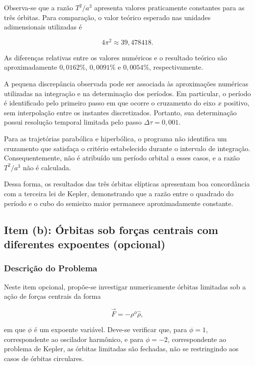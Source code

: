 \documentclass[12pt,a4paper]{article}
\begin{document}
Observa-se que a razão $T^2/a^3$ apresenta valores praticamente constantes para as três órbitas. Para comparação, o valor teórico esperado nas unidades adimensionais utilizadas é

\begin{equation}
    4\pi^2\approx39,478418.
\end{equation}

As diferenças relativas entre os valores numéricos e o resultado teórico são aproximadamente $0,0162\%$, $0,0091\%$ e $0,0054\%$, respectivamente.

A pequena discrepância observada pode ser associada às aproximações numéricas utilizadas na integração e na determinação dos períodos. Em particular, o período é identificado pelo primeiro passo em que ocorre o cruzamento do eixo $x$ positivo, sem interpolação entre os instantes discretizados. Portanto, sua determinação possui resolução temporal limitada pelo passo $\Delta\tau=0,001$.

Para as trajetórias parabólica e hiperbólica, o programa não identifica um cruzamento que satisfaça o critério estabelecido durante o intervalo de integração. Consequentemente, não é atribuído um período orbital a esses casos, e a razão $T^2/a^3$ não é calculada.

Dessa forma, os resultados das três órbitas elípticas apresentam boa concordância com a terceira lei de Kepler, demonstrando que a razão entre o quadrado do período e o cubo do semieixo maior permanece aproximadamente constante.

\subsection{Item (b): Órbitas sob forças centrais com diferentes expoentes (opcional)}

\subsubsection{Descrição do Problema}

Neste item opcional, propõe-se investigar numericamente órbitas limitadas sob a ação de forças centrais da forma

\begin{equation}
    \vec{F}=-\rho^{\phi}\hat{\rho},
\end{equation}

em que $\phi$ é um expoente variável. Deve-se verificar que, para $\phi=1$, correspondente ao oscilador harmônico, e para $\phi=-2$, correspondente ao problema de Kepler, as órbitas limitadas são fechadas, não se restringindo aos casos de órbitas circulares.
\end{document}
